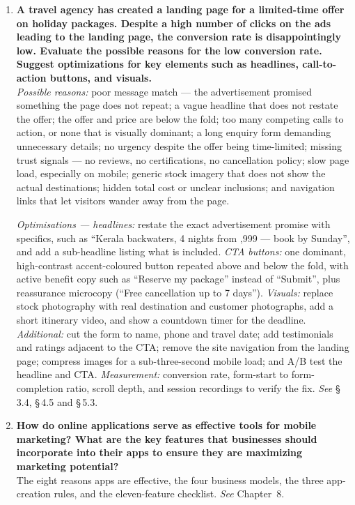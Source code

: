 \begin{enumerate}[leftmargin=2.2em,itemsep=1.4ex]
\item \textbf{A travel agency has created a landing page for a limited-time offer
      on holiday packages. Despite a high number of clicks on the ads leading to
      the landing page, the conversion rate is disappointingly low. Evaluate the
      possible reasons for the low conversion rate. Suggest optimizations for key
      elements such as headlines, call-to-action buttons, and visuals.}
      \\
      \emph{Possible reasons:} poor message match --- the advertisement promised
      something the page does not repeat; a vague headline that does not restate
      the offer; the offer and price are below the fold; too many competing calls
      to action, or none that is visually dominant; a long enquiry form demanding
      unnecessary details; no urgency despite the offer being time-limited;
      missing trust signals --- no reviews, no certifications, no cancellation
      policy; slow page load, especially on mobile; generic stock imagery that does
      not show the actual destinations; hidden total cost or unclear inclusions;
      and navigation links that let visitors wander away from the page.

      \emph{Optimisations --- headlines:} restate the exact advertisement promise
      with specifics, such as ``Kerala backwaters, 4 nights from ,999 ---
      book by Sunday'', and add a sub-headline listing what is included.
      \emph{CTA buttons:} one dominant, high-contrast accent-coloured button
      repeated above and below the fold, with active benefit copy such as
      ``Reserve my package'' instead of ``Submit'', plus reassurance microcopy
      (``Free cancellation up to 7 days'').
      \emph{Visuals:} replace stock photography with real destination and customer
      photographs, add a short itinerary video, and show a countdown timer for the
      deadline.
      \emph{Additional:} cut the form to name, phone and travel date; add
      testimonials and ratings adjacent to the CTA; remove the site navigation from
      the landing page; compress images for a sub-three-second mobile load; and
      A/B test the headline and CTA.
      \emph{Measurement:} conversion rate, form-start to form-completion ratio,
      scroll depth, and session recordings to verify the fix.
      \hfill\emph{See} \S\,3.4, \S\,4.5 and \S\,5.3.

\item \textbf{How do online applications serve as effective tools for mobile
      marketing? What are the key features that businesses should incorporate into
      their apps to ensure they are maximizing marketing potential?}
      \\
      The eight reasons apps are effective, the four business models, the three
      app-creation rules, and the eleven-feature checklist.
      \hfill\emph{See} Chapter~8.


\end{enumerate}
